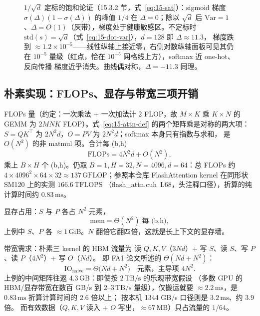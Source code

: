 \begin{figure}[H]
\caption{$1/\sqrt{d}$ 定标的饱和论证（15.3.2 节，式~\ref{eq:15-sat}）：sigmoid 梯度
$\sigma(\Delta)(1-\sigma(\Delta))$ 的峰值 $1/4$ 在 $\Delta=0$；除以 $\sqrt{d}$ 后
$\mathrm{Var}=1$、$\Delta=O(1)$（灰带），梯度处于健康敏感区。不定标时
$\mathrm{std}(s)=\sqrt{d}$（式~\ref{eq:15-dot-var}），$d=128$ 即 $\Delta\approx11.3$，
梯度跌到 $\approx1.2\times10^{-5}$——线性纵轴上接近零，右侧对数纵轴面板可见其仍在
$10^{-5}$ 量级（红点，恰在 $10^{-5}$ 网格线上方），softmax 近 one-hot、反向传播
梯度近乎消失。曲线偶对称，$\Delta=-11.3$ 同理。}
\label{fig:15-sqrt-d-scale}
\end{figure}

\subsection{朴素实现：FLOPs、显存与带宽三项开销}

FLOPs 量（约定：一次乘法 + 一次加法计 2 FLOP，故 $M{\times}K$ 乘 $K{\times}N$
的 GEMM 为 $2MNK$ FLOP）。式~\ref{eq:15-attn-def} 的两个矩阵乘是对称的两大项：
$S = QK^{\top}$ 为 $2N^{2}d$，$O = PV$ 为 $2N^{2}d$；softmax 本身只有指数与求和，
是 $O(N^{2})$ 的非 matmul 项。合计每 (b,h)
\begin{equation}
  \mathrm{FLOPs} = 4N^{2}d + O(N^{2}) ,
  \label{eq:15-naive-flops}
\end{equation}
乘上 $B \times H$ 个 (b,h)。仍取 $B{=}1, H{=}32, N{=}4096, d{=}64$：总 FLOPs 约
$4 \times 4096^{2} \times 64 \times 32 \approx 137\,\mathrm{GFLOP}$；参照本仓库
FlashAttention kernel 在同形状 SM120 上的实测 $166.6\,\mathrm{TFLOPS}$
（flash\_attn.cuh~L68，头注释口径），折算的纯计算时间约 $0.83\,\mathrm{ms}$。

显存占用：$S$ 与 $P$ 各占 $N^{2}$ 元素，
\begin{equation}
  \mathrm{mem} = \Theta(N^{2}) \;\text{每 (b,h)} ,
  \label{eq:15-naive-mem}
\end{equation}
上例中 $S$、$P$ 各 $\approx 1\,\mathrm{GiB}$。$N$ 翻倍它翻四倍，这就是长上下文的显存墙。

带宽需求：朴素三 kernel 的 HBM 流量为
读 $Q,K,V$（$3Nd$）$+$ 写 $S$、读 $S$、写 $P$、读 $P$（$4N^{2}$）$+$ 写 $O$（$Nd$）。
即 FA1 论文所述的 $\Theta(Nd + N^{2})$：
\begin{equation}
  \mathrm{IO}_{\text{naive}} = \Theta\bigl(Nd + N^{2}\bigr)
  \quad\text{元素，主导项 } 4N^{2} .
  \label{eq:15-naive-io}
\end{equation}
上例的中间矩阵往返 $4.3\,\mathrm{GB}$：即使按 $2\,\mathrm{TB/s}$ 的乐观带宽假设
（多数 GPU 的 HBM/显存带宽在数百 GB/s 到 $2$--$3\,\mathrm{TB/s}$ 量级），仅搬运就要
$\approx 2.2\,\mathrm{ms}$，是 $0.83\,\mathrm{ms}$ 折算计算时间的 $2.6$ 倍以上；
按本机 1344 GB/s 口径则是 $3.2\,\mathrm{ms}$、约 $3.9$ 倍。
而有效数据（$Q,K,V$ 读入 + $O$ 写出，$\approx 67\,\mathrm{MB}$）只占流量的 $1/64$。

